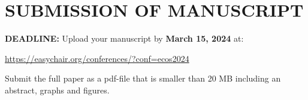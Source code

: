 \section{SUBMISSION OF MANUSCRIPT}

\textbf{DEADLINE:} Upload your manuscript by \textbf{March 15, 2024} at: 

\href{https://easychair.org/conferences/?conf=ecos2024}{https://easychair.org/conferences/?conf=ecos2024}

Submit the full paper as a pdf-file that is smaller than 20 MB including an abstract, graphs and figures.
